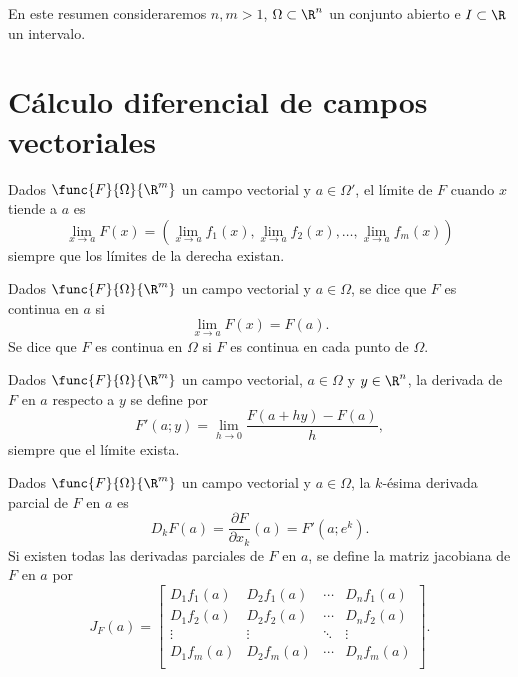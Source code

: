 \documentclass[a4,11pt]{aleph-notas}
\begin{document}
\encabezado

En este resumen consideraremos $n,m>1$, $\Omega\subset \R^n$ un conjunto abierto e $I\subset\R$ un intervalo.

\section{Cálculo diferencial de campos vectoriales}

\begin{defi}[Límite]
Dados $\func{F}{\Omega}{\R^m}$ un campo vectorial y $a\in \Omega'$, el límite de $F$ cuando $x$ tiende a $a$ es
\[
    \lim_{x\to a}F(x)
    =\left(\lim_{x\to a}f_1(x),\lim_{x\to a}f_2(x),\ldots,\lim_{x\to a}f_m(x)\right)
\]
siempre que los límites de la derecha existan.
\end{defi}

\begin{defi}[Continuidad]
Dados $\func{F}{\Omega}{\R^m}$ un campo vectorial y $a\in \Omega$, se dice que $F$ es continua en $a$ si
\[
    \lim_{x\to a}F(x)=F(a).
\]
Se dice que $F$ es continua en $\Omega$ si $F$ es continua en cada punto de $\Omega$.
\end{defi}

\begin{defi}
    Dados $\func{F}{\Omega}{\R^m}$ un campo vectorial, $a\in \Omega$ y $y\in \R^n$, la derivada de $F$ en $a$ respecto a $y$ se define por
    \[
        F'(a;y)=\lim_{h\to 0}\frac{F(a+hy)-F(a)}{h},
    \]
    siempre que el límite exista.
\end{defi}

\begin{defi}
    Dados $\func{F}{\Omega}{\R^m}$ un campo vectorial y $a\in \Omega$, la $k$-ésima derivada parcial de $F$ en $a$ es
    \[
        D_k F(a)=\frac{\partial F}{\partial x_k}(a)=F'(a;e^k).
    \]
    Si existen todas las derivadas parciales de $F$ en $a$, se define la matriz jacobiana de $F$ en $a$ por
    \[
        J_F(a) =
        \begin{bmatrix}
         D_1f_1(a) & D_2f_1(a) & \cdots & D_nf_1(a) \\
         D_1f_2(a) & D_2f_2(a) & \cdots & D_nf_2(a) \\
         \vdots & \vdots &  \ddots & \vdots\\
         D_1f_m(a) & D_2f_m(a) & \cdots & D_nf_m(a) \\
        \end{bmatrix}.
    \]
\end{defi}
\end{document}
